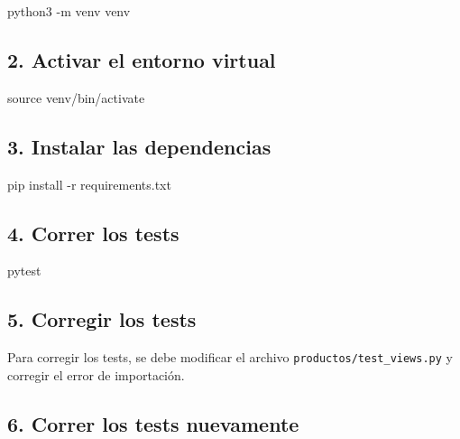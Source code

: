 \documentclass[
  a4paper,
  DIV=11,
  numbers=noendperiod,
  onepage,
  openany]{scrreprt}
\newenvironment{Shaded}{\begin{snugshade}}{\end{snugshade}}
\newcommand{\NormalTok}[1]{\textcolor[rgb]{0.00,0.23,0.31}{#1}}
\begin{document}
\begin{Shaded}
\begin{Highlighting}[]
\NormalTok{python3 {-}m venv venv}
\end{Highlighting}
\end{Shaded}

\subsection{2. Activar el entorno
virtual}\label{activar-el-entorno-virtual-1}

\begin{Shaded}
\begin{Highlighting}[]
\NormalTok{source venv/bin/activate}
\end{Highlighting}
\end{Shaded}

\subsection{3. Instalar las
dependencias}\label{instalar-las-dependencias}

\begin{Shaded}
\begin{Highlighting}[]
\NormalTok{pip install {-}r requirements.txt}
\end{Highlighting}
\end{Shaded}

\subsection{4. Correr los tests}\label{correr-los-tests}

\begin{Shaded}
\begin{Highlighting}[]
\NormalTok{pytest}
\end{Highlighting}
\end{Shaded}

\subsection{5. Corregir los tests}\label{corregir-los-tests}

Para corregir los tests, se debe modificar el archivo
\texttt{productos/test\_views.py} y corregir el error de importación.

\subsection{6. Correr los tests
nuevamente}\label{correr-los-tests-nuevamente}
\end{document}
